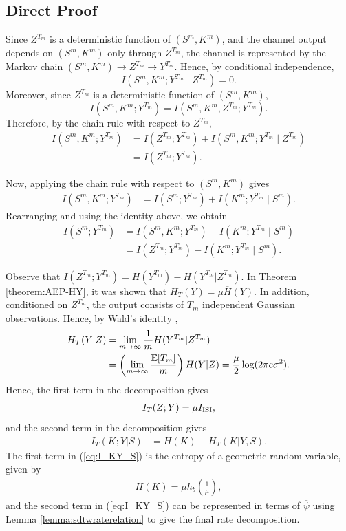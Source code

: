 \documentclass[onecolumn]{IEEEtran}
\theoremstyle{definition}
\begin{document}
\subsection{Direct Proof}
Since $Z^{T_m}$ is a deterministic function of $(S^m,K^m)$, and the channel
output depends on $(S^m,K^m)$ only through $Z^{T_m}$, the channel is represented
by the Markov chain $(S^m,K^m)\rightarrow Z^{T_m}\rightarrow Y^{T_m}$. Hence, by conditional independence,
\[
    I(S^m,K^m;Y^{T_m}\mid Z^{T_m})=0.
\]
Moreover, since $Z^{T_m}$ is a deterministic function of $(S^m,K^m)$,
\[
    I(S^m,K^m;Y^{T_m})
    =
    I(S^m,K^m,Z^{T_m};Y^{T_m}).
\]
Therefore, by the chain rule with respect to $Z^{T_m}$,
\begin{align*}
    I(S^m,K^m;Y^{T_m})
    &= I(Z^{T_m};Y^{T_m}) + I(S^m,K^m;Y^{T_m}\mid Z^{T_m}) \\
    &= I(Z^{T_m};Y^{T_m}).
\end{align*}

Now, applying the chain rule with respect to $(S^m,K^m)$ gives
\begin{align*}
    I(S^m,K^m;Y^{T_m})
    &= I(S^m;Y^{T_m}) + I(K^m;Y^{T_m}\mid S^m).
\end{align*}
Rearranging and using the identity above, we obtain
\begin{align*}
    I(S^m;Y^{T_m})
    &= I(S^m,K^m;Y^{T_m}) - I(K^m;Y^{T_m}\mid S^m) \\
    &= I(Z^{T_m};Y^{T_m}) - I(K^m;Y^{T_m}\mid S^m).
\end{align*}

Observe that $I(Z^{T_m};Y^{T_m})=H(Y^{T_m}) - H(Y^{T_m}|Z^{T_m})$. In Theorem \ref{theorem:AEP-HY}, it was shown that $H_T(Y) = \mu \overline{H}(Y)$.
{In addition, conditioned on \(Z^{T_m}\), the output consists of \(T_m\)
independent Gaussian observations. Hence, by Wald's identity
\cite[Theorem~5.3]{Gut2009},}
\begin{align*}
    H_T(Y|Z)&=\lim_{m\rightarrow\infty}\frac{1}{m}H(Y^{T_m}|Z^{T_m})\notag\\
    &= \left(\lim_{m\rightarrow\infty}\frac{\mathbb{E}[T_m]}{m}\right) H(Y|Z)= \frac{\mu}{2}\log(2\pi e \sigma^2).
\end{align*}
Hence, the first term in the decomposition gives
\begin{align*}
    I_T(Z;Y) = \mu I_{\rm ISI},
\end{align*}
and the second term in the decomposition gives
\begin{align}\label{eq:I_KY_S}
    I_T(K;Y|S) &= H(K) - H_T(K|Y,S).
\end{align}
The first term in (\ref{eq:I_KY_S}) is the entropy of a geometric random variable, given by
\begin{align*}
    H(K) = \mu h_b\left(\frac{1}{\mu}\right),
\end{align*}
and the second term in (\ref{eq:I_KY_S}) can be represented in terms of $\overline{\psi}$ using Lemma \ref{lemma:sdtwraterelation} to give the final rate decomposition.
\end{document}
